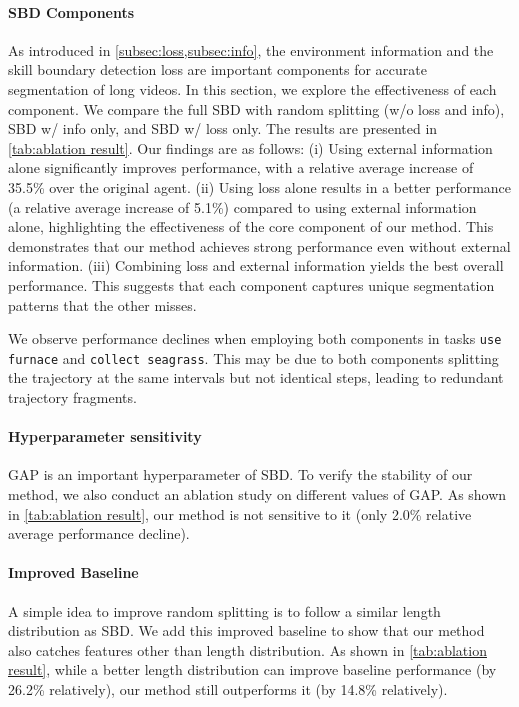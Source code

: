 \paragraph{SBD Components} As introduced in \cref{subsec:loss,subsec:info}, the environment information and the skill boundary detection loss are important components for accurate segmentation of long videos.
In this section, we explore the effectiveness of each component. 
We compare the full SBD with random splitting (w/o loss and info), SBD w/ info only, and SBD w/ loss only.
The results are presented in \cref{tab:ablation result}. Our findings are as follows:
(i) Using external information alone significantly improves performance, with a relative average increase of 35.5\% over the original agent.
(ii) Using loss alone results in a better performance (a relative average increase of 5.1\%) compared to using external information alone, highlighting the effectiveness of the core component of our method. This demonstrates that our method achieves strong performance even without external information.
(iii) Combining loss and external information yields the best overall performance. This suggests that each component captures unique segmentation patterns that the other misses. 

We observe performance declines when employing both components in tasks \texttt{use furnace} and \texttt{collect seagrass}. 
This may be due to both components splitting the trajectory at the same intervals but not identical steps, leading to redundant trajectory fragments.

\paragraph{Hyperparameter sensitivity} GAP is an important hyperparameter of SBD. To verify the stability of our method, we also conduct an ablation study on different values of GAP. As shown in \cref{tab:ablation result}, our method is not sensitive to it (only 2.0\% relative average performance decline).

\paragraph{Improved Baseline} A simple idea to improve random splitting is to follow a similar length distribution as SBD. We add this improved baseline to show that our method also catches features other than length distribution. As shown in \cref{tab:ablation result}, while a better length distribution can improve baseline performance (by 26.2\% relatively), our method still outperforms it (by 14.8\% relatively).

